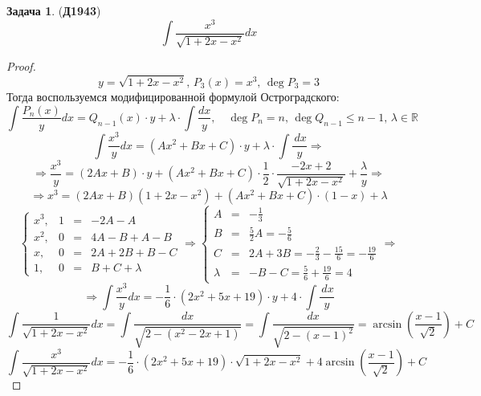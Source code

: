 \documentclass[12pt]{article}
\newcommand{\MR}{\mathbb{R}}
\newcommand{\dx}{\, dx}
\theoremstyle{definition}
\newtheorem{problem}{Задача}
\DeclareMathOperator{\dint}{\displaystyle\int}
\begin{document}
\begin{problem}(\textbf{Д1943})
	$$
		\dint \dfrac{x^3}{\sqrt{1 + 2x - x^2}}dx
	$$
\end{problem}
\begin{proof}
	$$
		y  = \sqrt{1 + 2x - x^2}, \, P_3(x) = x^3, \, \deg{P_3} = 3
	$$
	Тогда воспользуемся модифицированной формулой Остроградского:
	$$
		\dint \dfrac{P_n(x)}{y}dx = Q_{n-1}(x){\cdot}y + \lambda{\cdot}\dint\dfrac{dx}{y}, \quad \deg{P_n} = n, \, \deg{Q_{n-1}} \leq n-1, \, \lambda \in \MR
	$$
	$$
		\dint \dfrac{x^3}{y}dx = (Ax^2 + Bx + C){\cdot}y + \lambda{\cdot}\dint\dfrac{\dx}{y} \Rightarrow
	$$
	$$
		\Rightarrow \dfrac{x^3}{y} = (2Ax + B){\cdot}y + (Ax^2 + Bx + C){\cdot}\dfrac{1}{2}{\cdot}\dfrac{-2x + 2}{\sqrt{1 + 2x - x^2}} + \dfrac{\lambda}{y} \Rightarrow
	$$
	$$
		\Rightarrow x^3 = (2Ax + B)(1 + 2x - x^2) + (Ax^2 + Bx + C){\cdot}(1-x) + \lambda
	$$
	$$
		\left\{
			\begin{matrix}
				x^3, & 1 &=& -2A -A \\
				x^2, & 0 &=& 4A -B + A - B\\ 
				x, & 0 &=& 2A + 2B + B- C\\
				1, & 0 &=& B + C + \lambda
			\end{matrix} \Rightarrow
		\right.
		\left\{
			\begin{matrix}
				A &=& -\tfrac{1}{3}\\[6pt]
				B &=& \tfrac{5}{2}A = -\tfrac{5}{6}\\[6pt]
				C &=& 2A + 3B = -\tfrac{2}{3} - \tfrac{15}{6} = -\tfrac{19}{6}\\[6pt]
				\lambda &=& - B - C = \tfrac{5}{6} + \tfrac{19}{6} = 4
			\end{matrix} \Rightarrow
		\right.
	$$
	$$
		\Rightarrow \dint \dfrac{x^3}{y}dx = -\dfrac{1}{6}{\cdot}\left(2x^2 + 5x + 19\right){\cdot}y + 4{\cdot}\dint\dfrac{\dx}{y}
	$$
	$$
		\dint\dfrac{1}{\sqrt{1 + 2x - x^2}}dx = \dint \dfrac{dx}{\sqrt{2-(x^2 - 2x + 1)}} = \dint \dfrac{dx}{\sqrt{2 - (x - 1)^2}} = \arcsin{\left(\dfrac{x-1}{\sqrt{2}}\right)} + C
	$$
	$$
		\dint \dfrac{x^3}{\sqrt{1 + 2x - x^2}}dx = -\dfrac{1}{6}{\cdot}\left(2x^2 + 5x + 19\right){\cdot}\sqrt{1 + 2x - x^2} + 4\arcsin{\left(\dfrac{x-1}{\sqrt{2}}\right)} + C
	$$
\end{proof}
\end{document}
